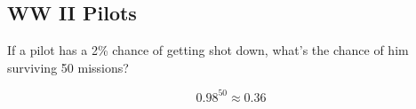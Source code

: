 \documentclass[letterpaper, landscape]{exam}
\begin{document}
  \subsection{WW II Pilots}
  If a pilot has a 2\% chance of getting shot down, what's the chance of him
  surviving 50 missions?

  \begin{solution}
    \[
      0.98^{50} \approx 0.36
    \]
  \end{solution}







\end{document}
